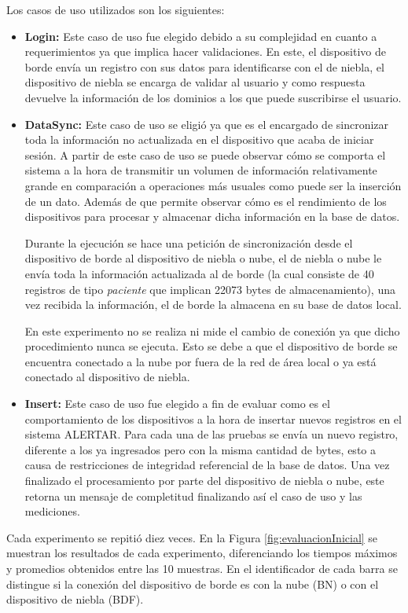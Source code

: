 Los casos de uso utilizados son los siguientes:
\begin{itemize}
    \item \textbf{Login: }Este caso de uso fue elegido debido a su complejidad en cuanto a requerimientos ya que implica hacer validaciones. En este, el dispositivo de borde envía un registro con sus datos para identificarse con el de niebla, el dispositivo de niebla se encarga de validar al usuario y como respuesta devuelve la información de los dominios a los que puede suscribirse el usuario.
    
    \item \textbf{DataSync: }Este caso de uso se eligió ya que es el encargado de sincronizar toda la información no actualizada en el dispositivo que acaba de iniciar sesión. A partir de este caso de uso se puede observar cómo se comporta el sistema a la hora de transmitir un volumen de información relativamente grande en comparación a operaciones más usuales como puede ser la inserción de un dato. Además de que permite observar cómo es el rendimiento de los dispositivos para procesar y almacenar dicha información en la base de datos.

    Durante la ejecución se hace una petición de sincronización desde el dispositivo de borde al dispositivo de niebla o nube, el de niebla o nube le envía toda la información actualizada al de borde (la cual consiste de 40 registros de tipo \textit{paciente} que implican 22073 bytes de almacenamiento), una vez recibida la información, el de borde la almacena en su base de datos local.

    En este experimento no se realiza ni mide el cambio de conexión ya que dicho procedimiento nunca se ejecuta. Esto se debe a que el dispositivo de borde se encuentra conectado a la nube por fuera de la red de área local o ya está conectado al dispositivo de niebla.
    \item \textbf{Insert: }Este caso de uso fue elegido a fin de evaluar como es el comportamiento de los dispositivos a la hora de insertar nuevos registros en el sistema ALERTAR. Para cada una de las pruebas se envía un nuevo registro, diferente a los ya ingresados pero con la misma cantidad de bytes, esto a causa de restricciones de integridad referencial de la base de datos. Una vez finalizado el procesamiento por parte del dispositivo de niebla o nube, este retorna un mensaje de completitud finalizando así el caso de uso y las mediciones.
\end{itemize}

Cada experimento se repitió diez veces. En la Figura \ref{fig:evaluacionInicial} se muestran los resultados de cada experimento, diferenciando los tiempos máximos y promedios obtenidos entre las 10 muestras. En el identificador de cada barra se distingue si la conexión del dispositivo de borde es con la nube (BN) o con el dispositivo de niebla (BDF).

